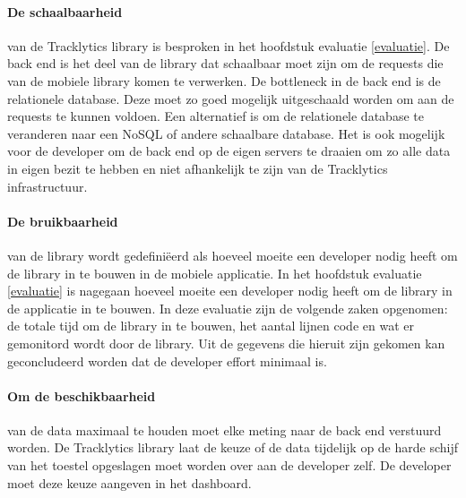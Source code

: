 \paragraph{De schaalbaarheid} van de Tracklytics library is besproken in het hoofdstuk evaluatie \ref{evaluatie}. De back end is het deel van de library dat schaalbaar moet zijn om de requests die van de mobiele library komen te verwerken. De bottleneck in de back end is de relationele database. Deze moet zo goed mogelijk uitgeschaald worden om aan de requests te kunnen voldoen. Een alternatief is om de relationele database te veranderen naar een NoSQL of andere schaalbare database. Het is ook mogelijk voor de developer om de back end op de eigen servers te draaien om zo alle data in eigen bezit te hebben en niet afhankelijk te zijn van de Tracklytics infrastructuur.\\


\paragraph{De bruikbaarheid} van de library wordt gedefini\"eerd als hoeveel moeite een developer nodig heeft om de library in te bouwen in de mobiele applicatie. In het hoofdstuk evaluatie \ref{evaluatie} is nagegaan hoeveel moeite een developer nodig heeft om de library in de applicatie in te bouwen. In deze evaluatie zijn de volgende zaken opgenomen: de totale tijd om de library in te bouwen, het aantal lijnen code en wat er gemonitord wordt door de library. Uit de gegevens die hieruit zijn gekomen kan geconcludeerd worden dat de developer effort minimaal is.

\paragraph{Om de beschikbaarheid} van de data maximaal te houden moet elke meting naar de back end verstuurd worden. De Tracklytics library laat de keuze of de data tijdelijk op de harde schijf van het toestel opgeslagen moet worden over aan de developer zelf. De developer moet deze keuze aangeven in het dashboard. \\

